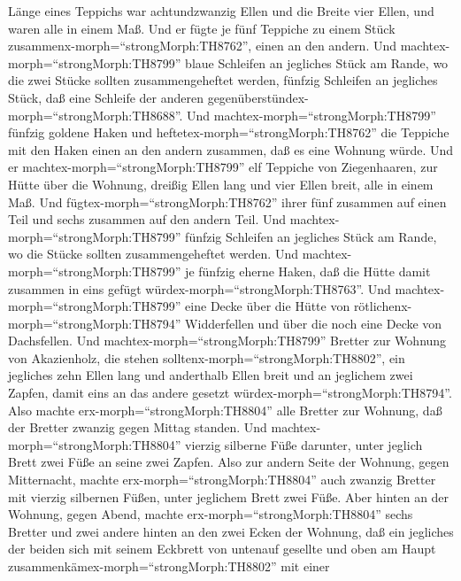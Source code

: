 Länge eines Teppichs war achtundzwanzig Ellen und die Breite vier Ellen,
und waren alle in einem Maß.  Und er fügte je fünf Teppiche
zu einem Stück zusammenx-morph=``strongMorph:TH8762'', einen an den
andern.  Und machtex-morph=``strongMorph:TH8799'' blaue
Schleifen an jegliches Stück am Rande, wo die zwei Stücke sollten
zusammengeheftet werden,  fünfzig Schleifen an jegliches
Stück, daß eine Schleife der anderen
gegenüberstündex-morph=``strongMorph:TH8688''.  Und
machtex-morph=``strongMorph:TH8799'' fünfzig goldene Haken und
heftetex-morph=``strongMorph:TH8762'' die Teppiche mit den Haken einen
an den andern zusammen, daß es eine Wohnung würde.  Und er
machtex-morph=``strongMorph:TH8799'' elf Teppiche von Ziegenhaaren, zur
Hütte über die Wohnung,  dreißig Ellen lang und vier Ellen
breit, alle in einem Maß.  Und
fügtex-morph=``strongMorph:TH8762'' ihrer fünf zusammen auf einen Teil
und sechs zusammen auf den andern Teil.  Und
machtex-morph=``strongMorph:TH8799'' fünfzig Schleifen an jegliches
Stück am Rande, wo die Stücke sollten zusammengeheftet werden.
 Und machtex-morph=``strongMorph:TH8799'' je fünfzig eherne
Haken, daß die Hütte damit zusammen in eins gefügt
würdex-morph=``strongMorph:TH8763''.  Und
machtex-morph=``strongMorph:TH8799'' eine Decke über die Hütte von
rötlichenx-morph=``strongMorph:TH8794'' Widderfellen und über die noch
eine Decke von Dachsfellen.  Und
machtex-morph=``strongMorph:TH8799'' Bretter zur Wohnung von
Akazienholz, die stehen solltenx-morph=``strongMorph:TH8802'',
 ein jegliches zehn Ellen lang und anderthalb Ellen breit
 und an jeglichem zwei Zapfen, damit eins an das andere
gesetzt würdex-morph=``strongMorph:TH8794''. Also machte
erx-morph=``strongMorph:TH8804'' alle Bretter zur Wohnung, 
daß der Bretter zwanzig gegen Mittag standen.  Und
machtex-morph=``strongMorph:TH8804'' vierzig silberne Füße darunter,
unter jeglich Brett zwei Füße an seine zwei Zapfen.  Also
zur andern Seite der Wohnung, gegen Mitternacht, machte
erx-morph=``strongMorph:TH8804'' auch zwanzig Bretter  mit
vierzig silbernen Füßen, unter jeglichem Brett zwei Füße. 
Aber hinten an der Wohnung, gegen Abend, machte
erx-morph=``strongMorph:TH8804'' sechs Bretter  und zwei
andere hinten an den zwei Ecken der Wohnung,  daß ein
jegliches der beiden sich mit seinem Eckbrett von untenauf gesellte und
oben am Haupt zusammenkämex-morph=``strongMorph:TH8802'' mit einer
